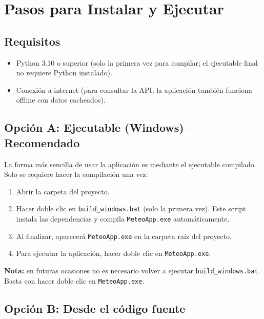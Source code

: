 \documentclass[12pt,a4paper]{article}
\begin{document}
\section{Pasos para Instalar y Ejecutar}
\subsection{Requisitos}
\begin{itemize}
    \item Python 3.10 o superior (solo la primera vez para compilar; el ejecutable final no requiere Python instalado).
    \item Conexión a internet (para consultar la API; la aplicación también funciona offline con datos cacheados).
\end{itemize}

\subsection{Opción A: Ejecutable (Windows) -- Recomendado}

La forma más sencilla de usar la aplicación es mediante el ejecutable compilado. Solo se requiere hacer la compilación una vez:

\begin{enumerate}[itemsep=4pt]
    \item Abrir la carpeta del proyecto.
    \item Hacer doble clic en \texttt{build\_windows.bat} (solo la primera vez). Este script instala las dependencias y compila \texttt{MeteoApp.exe} automáticamente.
    \item Al finalizar, aparecerá \texttt{MeteoApp.exe} en la carpeta raíz del proyecto.
    \item Para ejecutar la aplicación, hacer doble clic en \texttt{MeteoApp.exe}.
\end{enumerate}

\noindent\textbf{Nota:} en futuras ocasiones no es necesario volver a ejecutar \texttt{build\_windows.bat}. Basta con hacer doble clic en \texttt{MeteoApp.exe}.

\subsection{Opción B: Desde el código fuente}
\end{document}
